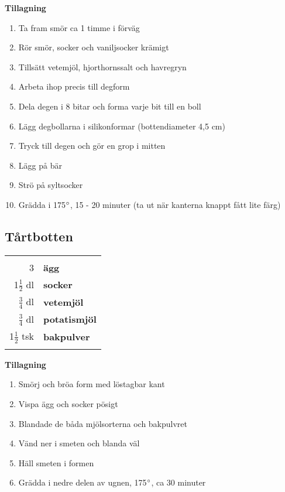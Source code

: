 \begin{multicols*}{2}

\noindent \textbf{Tillagning}
\begin{enumerate}
	\itemsep0cm
	\item Ta fram smör ca 1 timme i \mbox{förväg}
	\item Rör smör, socker och vanilj\-socker krämigt
	\item Tillsätt vetemjöl, hjorthornssalt och havregryn
	\item Arbeta ihop precis till degform
	\item Dela degen i 8 bitar och forma varje bit till en boll
	\item Lägg degbollarna i silikon\-formar (bottendiameter 4,5 cm)
	\item Tryck till degen och gör en grop i mitten
	\item Lägg på bär
	\item Strö på syltsocker
	\item Grädda i 175$\degree$, 15 - 20 minuter (ta ut när kanterna knappt fått lite färg)
\end{enumerate}

\end{multicols*}

\clearpage

\subsection{Tårtbotten}

\begin{table}[H]
	\begin{tabular}{rl}
	\hline
	&\\
		3 & \textbf{ägg}\\
		1$\frac{1}{2}$ dl & \textbf{socker}\\
		$\frac{3}{4}$ dl & \textbf{vetemjöl}\\
		$\frac{3}{4}$ dl & \textbf{potatismjöl}\\
		1$\frac{1}{2}$ tsk & \textbf{bakpulver}\\
	&\\
	\hline
	\end{tabular}
\end{table}

\begin{multicols*}{2}

\noindent \textbf{Tillagning}
\begin{enumerate}
	\itemsep0cm
	\item Smörj och bröa form med löstagbar kant
	\item Vispa ägg och socker pösigt
	\item Blandade de båda mjölsorterna och bakpulvret
	\item Vänd ner i smeten och blanda väl
	\item Häll smeten i formen
	\item Grädda i nedre delen av ugnen, 175$\degree$, ca 30 minuter
\end{enumerate}

\end{multicols*}

